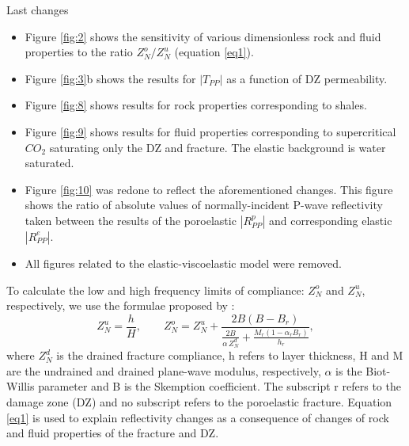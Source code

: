 \documentclass[draft,jgrga]{agutexSI2019}
\begin{document}
\begin{article}

%
Last changes 

\begin{itemize}
    \item  Figure \ref{fig:2} shows the sensitivity of various dimensionless rock and fluid properties to the ratio $Z_N^o/Z_N^u$ (equation \ref{eq1}).
    \item Figure \ref{fig:3}b shows the results for $|T_{PP}|$ as a function of DZ permeability.
    \item Figure \ref{fig:8} shows results for rock properties corresponding to shales.
    \item Figure \ref{fig:9} shows results for fluid properties corresponding to supercritical $CO_2$ saturating only the DZ and fracture. The elastic background is water saturated.
    \item Figure \ref{fig:10} was redone to reflect the aforementioned changes. This figure shows the ratio of absolute values of normally-incident P-wave reflectivity taken between the results of the poroelastic $|R_{PP}^p|$ and corresponding elastic $|R_{PP}^e|$.
    
    \item All figures related to the elastic-viscoelastic model were removed.
\end{itemize}

To  calculate the low and high frequency limits of compliance: $Z_N^o$ and $Z_N^u$, respectively, we use the formulae proposed by \cite{Rubino2015a}:
\begin{equation}\label{eq1}
    Z_N^u =  \frac{h}{H},\qquad
    Z_N^o = Z_N^u + \frac{2B(B-B_r)}{\frac{2B}{\alpha \,Z_N^d} + \frac{M_r(1-\alpha_r B_r)}{h_r}},
\end{equation}
where $Z_N^d$ is the drained fracture compliance, h refers to layer thickness, H and M are the undrained and drained plane-wave modulus, respectively, $\alpha$ is the Biot-Willis parameter and B is the Skemption coefficient. The subscript r refers to the damage zone (DZ) and no subscript refers to the poroelastic fracture. Equation \ref{eq1} is used to explain reflectivity changes as a consequence of changes of rock and fluid properties of the fracture and DZ.



\end{article}
\end{document}
